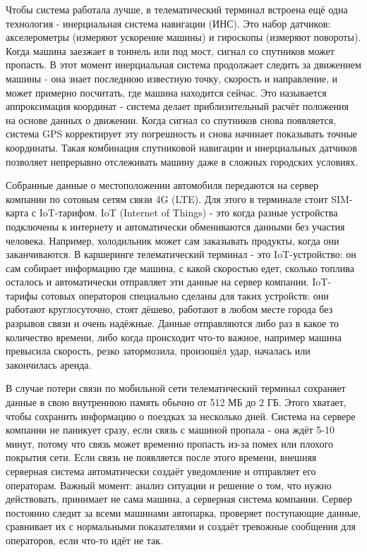 Чтобы система работала лучше, в телематический терминал встроена ещё одна технология - инерциальная система навигации (ИНС). Это набор датчиков: акселерометры (измеряют ускорение машины) и гироскопы (измеряют повороты). Когда машина заезжает в тоннель или под мост, сигнал со спутников может пропасть. В этот момент инерциальная система продолжает следить за движением машины - она знает последнюю известную точку, скорость и направление, и может примерно посчитать, где машина находится сейчас. Это называется аппроксимация координат - система делает приблизительный расчёт положения на основе данных о движении. Когда сигнал со спутников снова появляется, система GPS корректирует эту погрешность и снова начинает показывать точные координаты. Такая комбинация спутниковой навигации и инерциальных датчиков позволяет непрерывно отслеживать машину даже в сложных городских условиях.

Собранные данные о местоположении автомобиля передаются на сервер компании по сотовым сетям связи 4G (LTE). Для этого в терминале стоит SIM-карта с IoT-тарифом. IoT (Internet of Things) - это когда разные устройства подключены к интернету и автоматически обмениваются данными без участия человека. Например, холодильник может сам заказывать продукты, когда они заканчиваются. В каршеринге телематический терминал - это IoT-устройство: он сам собирает информацию где машина, с какой скоростью едет, сколько топлива осталось и автоматически отправляет эти данные на сервер компании. IoT-тарифы сотовых операторов специально сделаны для таких устройств: они работают круглосуточно, стоят дёшево, работают в любом месте города без разрывов связи и очень надёжные. Данные отправляются либо раз в какое то количество времени, либо когда происходит что-то важное, например машина превысила скорость, резко затормозила, произошёл удар, началась или закончилась аренда.

В случае потери связи по мобильной сети телематический терминал сохраняет данные в свою внутреннюю память обычно от 512 МБ до 2 ГБ. Этого хватает, чтобы сохранить информацию о поездках за несколько дней. Система на сервере компании не паникует сразу, если связь с машиной пропала - она ждёт 5-10 минут, потому что связь может временно пропасть из-за помех или плохого покрытия сети. Если связь не появляется после этого времени, внешняя серверная система автоматически создаёт уведомление и отправляет его операторам. Важный момент: анализ ситуации и решение о том, что нужно действовать, принимает не сама машина, а серверная система компании. Сервер постоянно следит за всеми машинами автопарка, проверяет поступающие данные, сравнивает их с нормальными показателями и создаёт тревожные сообщения для операторов, если что-то идёт не так.

